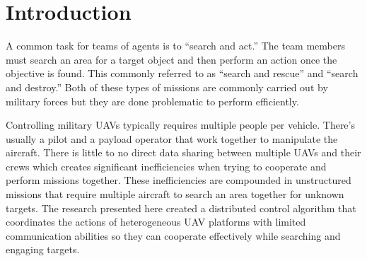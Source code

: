 \chapter{Introduction}
A common task for teams of agents is to ``search and act.''  The team members must search an area for a target object and then perform an action once the objective is found.  This commonly referred to as ``search and rescue'' and ``search and destroy.'' Both of these types of missions are commonly carried out by military forces but they are done problematic to perform efficiently.

Controlling military UAVs typically requires multiple people per vehicle.  There’s usually a pilot and a payload operator that work together to manipulate the aircraft.  There is little to no direct data sharing between multiple UAVs and their crews which creates significant inefficiencies when trying to cooperate and perform missions together.  These inefficiencies are compounded in unstructured missions that require multiple aircraft to search an area together for unknown targets.  The research presented here created a distributed control algorithm that coordinates the actions of heterogeneous UAV platforms with limited communication abilities so they can cooperate effectively while searching and engaging targets.
